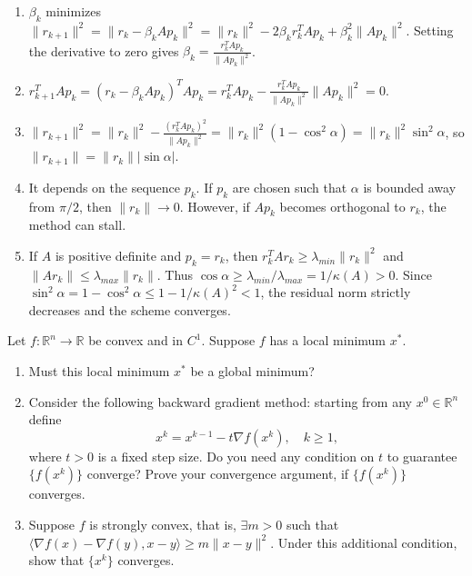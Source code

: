 \begin{solution}
\begin{enumerate}
    \item $\beta_k$ minimizes $\|r_{k+1}\|^2 = \|r_k - \beta_k A p_k\|^2 = \|r_k\|^2 - 2\beta_k r_k^T A p_k + \beta_k^2 \|A p_k\|^2$. Setting the derivative to zero gives $\beta_k = \frac{r_k^T A p_k}{\|A p_k\|^2}$.
    \item $r_{k+1}^T A p_k = (r_k - \beta_k A p_k)^T A p_k = r_k^T A p_k - \frac{r_k^T A p_k}{\|A p_k\|^2} \|A p_k\|^2 = 0$.
    \item $\|r_{k+1}\|^2 = \|r_k\|^2 - \frac{(r_k^T A p_k)^2}{\|A p_k\|^2} = \|r_k\|^2 (1 - \cos^2 \alpha) = \|r_k\|^2 \sin^2 \alpha$, so $\|r_{k+1}\| = \|r_k\| |\sin \alpha|$.
    \item It depends on the sequence $p_k$. If $p_k$ are chosen such that $\alpha$ is bounded away from $\pi/2$, then $\|r_k\| \to 0$. However, if $A p_k$ becomes orthogonal to $r_k$, the method can stall.
    \item If $A$ is positive definite and $p_k = r_k$, then $r_k^T A r_k \geq \lambda_{min} \|r_k\|^2$ and $\|A r_k\| \leq \lambda_{max} \|r_k\|$. Thus $\cos \alpha \geq \lambda_{min} / \lambda_{max} = 1/\kappa(A) > 0$. Since $\sin^2 \alpha = 1 - \cos^2 \alpha \le 1 - 1/\kappa(A)^2 < 1$, the residual norm strictly decreases and the scheme converges.
\end{enumerate}
\end{solution}

\begin{exercise}
\label{applied:2016:10}
Let $f: \mathbb{R}^n \to \mathbb{R}$ be convex and in $C^1$. Suppose $f$ has a local minimum $x^*$.
\begin{enumerate}
    \item Must this local minimum $x^*$ be a global minimum?
    \item Consider the following backward gradient method: starting from any $x^0 \in \mathbb{R}^n$ define
    \[
    x^k = x^{k-1} - t \nabla f(x^k), \quad k \geq 1,
    \]
    where $t > 0$ is a fixed step size. Do you need any condition on $t$ to guarantee $\{f(x^k)\}$ converge? Prove your convergence argument, if $\{f(x^k)\}$ converges.
    \item Suppose $f$ is strongly convex, that is, $\exists m > 0$ such that $\langle \nabla f(x) - \nabla f(y), x-y \rangle \geq m \|x-y\|^2$. Under this additional condition, show that $\{x^k\}$ converges.
\end{enumerate}
\end{exercise}

